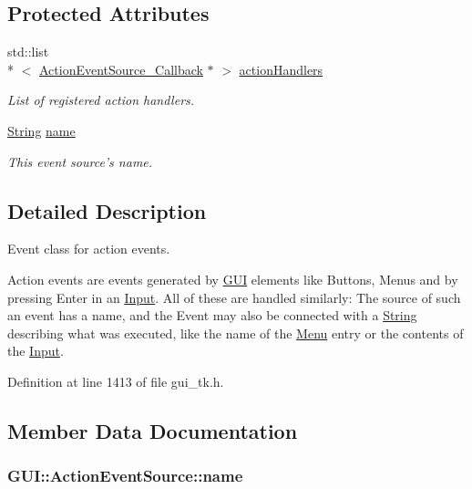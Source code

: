 \subsection*{Protected Attributes}
\begin{DoxyCompactItemize}
\item 
\hypertarget{classGUI_1_1ActionEventSource_a9cd3562084ba5fa2b3d9d72ac3fa1baa}{std\-::list\\*
$<$ \hyperlink{structGUI_1_1ActionEventSource__Callback}{Action\-Event\-Source\-\_\-\-Callback} $\ast$ $>$ \hyperlink{classGUI_1_1ActionEventSource_a9cd3562084ba5fa2b3d9d72ac3fa1baa}{action\-Handlers}}\label{classGUI_1_1ActionEventSource_a9cd3562084ba5fa2b3d9d72ac3fa1baa}

\begin{DoxyCompactList}\small\item\em List of registered action handlers. \end{DoxyCompactList}\item 
\hyperlink{classGUI_1_1String}{String} \hyperlink{classGUI_1_1ActionEventSource_ab494e66ccff6518e1cabe747df2173f8}{name}
\begin{DoxyCompactList}\small\item\em This event source's name. \end{DoxyCompactList}\end{DoxyCompactItemize}


\subsection{Detailed Description}
Event class for action events. 

Action events are events generated by \hyperlink{namespaceGUI}{G\-U\-I} elements like Buttons, Menus and by pressing Enter in an \hyperlink{classGUI_1_1Input}{Input}. All of these are handled similarly\-: The source of such an event has a name, and the Event may also be connected with a \hyperlink{classGUI_1_1String}{String} describing what was executed, like the name of the \hyperlink{classGUI_1_1Menu}{Menu} entry or the contents of the \hyperlink{classGUI_1_1Input}{Input}. 

Definition at line 1413 of file gui\-\_\-tk.\-h.



\subsection{Member Data Documentation}
\hypertarget{classGUI_1_1ActionEventSource_ab494e66ccff6518e1cabe747df2173f8}{
\subsubsection[{name}]{ {\bf G\-U\-I\-::\-Action\-Event\-Source\-::name}}}\label{classGUI_1_1ActionEventSource_ab494e66ccff6518e1cabe747df2173f8}


